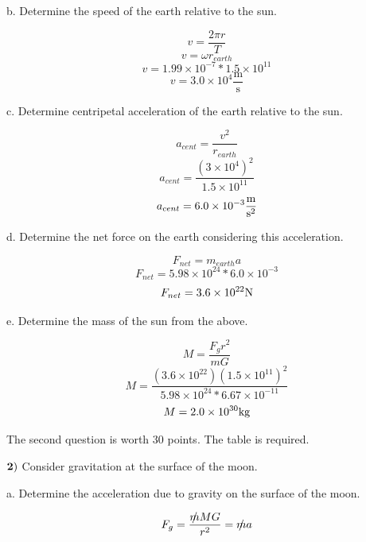 \documentclass{article}
\begin{document}
 b.  Determine the speed of the earth relative to the sun.
 
 $$v=\frac{2\pi r}{T}$$ %
 $$v=\omega r_{earth}$$ %
 $$v=1.99 \times 10^{-7} * 1.5 \times 10^{11}$$ %
 $$v=3.0 \times 10^{4} \frac{\text{m}}{\text{s}}$$ %
 
  
 c.  Determine centripetal acceleration of the earth relative to the sun.
 
 $$a_{cent}=\frac{v^{2}}{r_{earth}}$$
 $$a_{cent}=\frac{(3 \times 10^{4})^{2}}{1.5 \times 10^{11}}$$
 $$a_{cent}=6.0 \times 10^{-3} \frac{\text{m}}{\text s^{2}}$$       %
 
 
 d. Determine the net force on the earth considering this acceleration.
 
 $$F_{net}=m_{earth}a$$ %
 $$F_{net}=5.98 \times 10^{24} * 6.0 \times 10^{-3}$$
 $$F_{net}=3.6 \times 10^{22} \text N$$ 
 
 
 \newpage
 e. Determine the mass of the sun from the above.
 
 $$M=\frac{F_{g}r^{2}}{mG}$$ %
 $$M=\frac{(3.6 \times 10^{22}) (1.5 \times 10^{11})^{2}}{5.98       \times 10^{24} * 6.67 \times 10^{-11}}$$
 $$M=2.0 \times 10^{30} \text k \text g$$ 
 


  \newpage
  The second question is worth 30 points.  The table is required.
  
 $\bf{2)}$  Consider gravitation at the surface of the moon.
 
 \vspace{1cm}

  
 a.  Determine the acceleration due to gravity on the surface of the moon.
 
 \def\qeq{\mathrel{%
    \mathchoice{\QEQ}{\QEQ}{\scriptsize\QEQ}{\tiny\QEQ}%
}}
\def\QEQ{{%
    \setbox0\hbox{$m$}%
    \rlap{\hbox to \wd0{\hss/\hss}}\box0
}}

  $$F_{g}=\frac{ {\qeq} MG}{r^2}={\qeq}a$$
  
\end{document}

